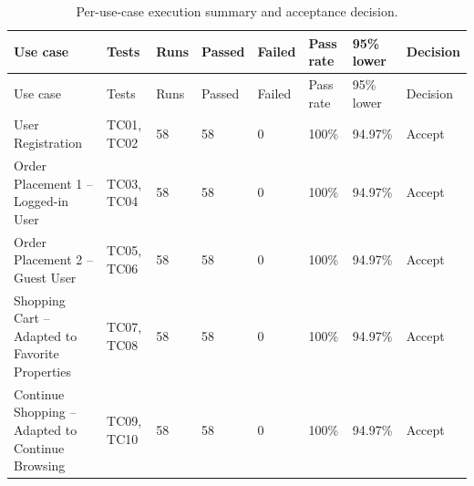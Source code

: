 {\footnotesize
\setlength{\tabcolsep}{4pt}
\begin{longtable}{@{}p{5.2cm} p{2.2cm} p{0.9cm} p{0.9cm} p{0.9cm} p{1.2cm} p{1.2cm} p{1.2cm}@{}}
  \caption{Per-use-case execution summary and acceptance decision.\label{tab:use-cases}}\\
  \toprule
  Use case & Tests & Runs & Passed & Failed & Pass rate & 95\% lower & Decision \\
  \midrule
  \endfirsthead
  \toprule
  Use case & Tests & Runs & Passed & Failed & Pass rate & 95\% lower & Decision \\
  \midrule
  \endhead
  \bottomrule
  \endlastfoot
  User Registration & TC01, TC02 & 58 & 58 & 0 & 100\% & 94.97\% & Accept \\
  Order Placement 1 -- Logged-in User & TC03, TC04 & 58 & 58 & 0 & 100\% & 94.97\% & Accept \\
  Order Placement 2 -- Guest User & TC05, TC06 & 58 & 58 & 0 & 100\% & 94.97\% & Accept \\
  Shopping Cart -- Adapted to Favorite Properties & TC07, TC08 & 58 & 58 & 0 & 100\% & 94.97\% & Accept \\
  Continue Shopping -- Adapted to Continue Browsing & TC09, TC10 & 58 & 58 & 0 & 100\% & 94.97\% & Accept \\
\end{longtable}
}
